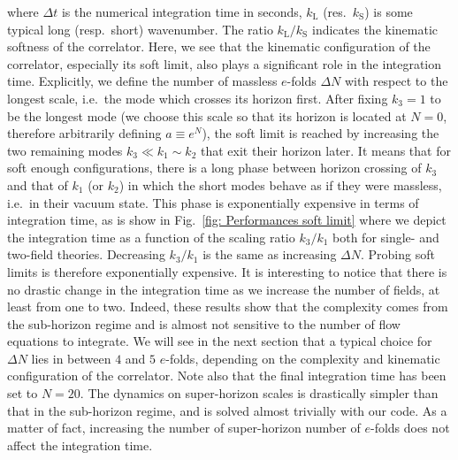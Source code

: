 \documentclass[11pt]{article}
\numberwithin{equation}{section} %
\begin{document}
where $\Delta t$ is the numerical integration time in seconds, $k_\text{L}$ (res.~$k_\text{S}$) is some typical long (resp.~short) wavenumber. The ratio $k_{\text{L}}/k_{\text{S}}$ indicates the kinematic softness of the correlator. Here, we see that the kinematic configuration of the correlator, especially its soft limit, also plays a significant role in the integration time. Explicitly, we define the number of massless $e$-folds $\Delta N$ with respect to the longest scale, i.e.~the mode which crosses its horizon first. After fixing $k_3 = 1$ to be the longest mode (we choose this scale so that its horizon is located at $N=0$, therefore arbitrarily defining $a \equiv e^N$), the soft limit is reached by increasing the two remaining modes $k_3 \ll k_1\sim k_2$ that exit their horizon later. It means that for soft enough configurations, there is a long phase between horizon crossing of $k_3$ and that of $k_1$ (or $k_2$) in which the short modes behave as if they were massless, i.e.~in their vacuum state. This phase is exponentially expensive in terms of integration time, as is show in Fig.~\ref{fig: Performances soft limit} where we depict the integration time as a function of the scaling ratio $k_3/k_1$ both for single- and two-field theories. Decreasing $k_3/k_1$ is the same as increasing $\Delta N$. Probing soft limits is therefore exponentially expensive. It is interesting to notice that there is no drastic change in the integration time as we increase the number of fields, at least from one to two. Indeed, these results show that the complexity comes from the sub-horizon regime and is almost not sensitive to the number of flow equations to integrate. We will see in the next section that a typical choice for $\Delta N$ lies in between $4$ and $5$ $e$-folds, depending on the complexity and kinematic configuration of the correlator. Note also that the final integration time has been set to $N = 20$. The dynamics on super-horizon scales is drastically simpler than that in the sub-horizon regime, and is solved almost trivially with our code. As a matter of fact, increasing the number of super-horizon number of $e$-folds does not affect the integration time. 
\end{document}
